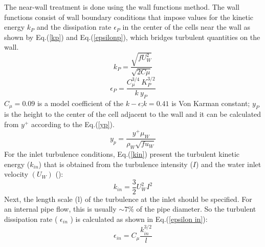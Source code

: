 \documentclass[11pt]{report}
\begin{document}
The near-wall treatment is done using the wall functions method. 
%
The wall functions consist of wall boundary conditions that impose values for the kinetic energy $k_{P}$ and the dissipation rate $\epsilon_{P}$  in the center of the cells near the wall as shown by Eq.(\ref{kp}) and Eq.(\ref{epsilonp}), which bridges turbulent quantities on the wall.
%
\begin{equation}
k_{P} =\frac{\sqrt{f {U_{W}^2 }}}{\sqrt{2 C\mu }}
\label{kp}
\end{equation}
%
\begin{equation}
\epsilon_{P} =\frac{C^{3/4}_{\mu } \ K^{3/2}_{P}}{k\ y_{P}}
\label{epsilonp}
\end{equation}
\(C_{\mu}=0.09\) is a model coefficient of the \(k-\epsilon\);\quad $k=0.41$ is Von Karman constant; 
%
$y_{P}$ is the height to the center of the cell adjacent to the wall and it can be calculated from $y^+$ according to the Eq.(\ref{yp}).
%
\begin{equation}
y_{p}=\frac{y^{+} \mu_W}{\rho_W\sqrt{f u_{W}}}
\label{yp}
\end{equation}
%
For the inlet turbulence conditions, Eq.(\ref{kin}) present the turbulent kinetic energy (\(k_{in}\)) that is obtained from the turbulence intensity (\(I\)) and the water inlet velocity \((U_W)\) (\citet{Messa-2020}):
%
\begin{equation}
k_{in} =\frac{3}{2} U_W^{2} I^{2} 
\label{kin}
\end{equation}
%
Next, the length scale (l) of the turbulence at the inlet should be specified. 
%
For an internal pipe flow, this is usually \(\sim 7 \%\) of the pipe diameter. So the turbulent dissipation rate ( \(\epsilon_{in}\) ) is calculated as shown in Eq.(\ref{epsilon in}): 
%
\begin{equation}
\epsilon_{in}=C_{\mu} \frac{k_{in}^{3 / 2}}{l} 
\label{epsilon in}
\end{equation}
\end{document}
